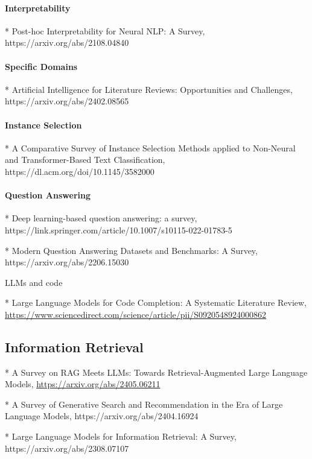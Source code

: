 \paragraph{Interpretability}

* Post-hoc Interpretability for Neural NLP: A Survey, https://arxiv.org/abs/2108.04840
 
\paragraph{Specific Domains}

* Artificial Intelligence for Literature Reviews: Opportunities and Challenges, https://arxiv.org/abs/2402.08565
 
\paragraph{Instance Selection}

* A Comparative Survey of Instance Selection Methods applied to Non-Neural and Transformer-Based Text Classification, https://dl.acm.org/doi/10.1145/3582000 

\paragraph{Question Answering}

* Deep learning-based question answering: a survey, https://link.springer.com/article/10.1007/s10115-022-01783-5

* Modern Question Answering Datasets and Benchmarks: A Survey, https://arxiv.org/abs/2206.15030

LLMs and code

* Large Language Models for Code Completion: A Systematic Literature Review, 
\url{https://www.sciencedirect.com/science/article/pii/S0920548924000862}
 
\subsection{Information Retrieval}

* A Survey on RAG Meets LLMs: Towards Retrieval-Augmented Large Language Models, \url{https://arxiv.org/abs/2405.06211}

* A Survey of Generative Search and Recommendation in the Era of Large Language Models,
https://arxiv.org/abs/2404.16924

* Large Language Models for Information Retrieval: A Survey, https://arxiv.org/abs/2308.07107

